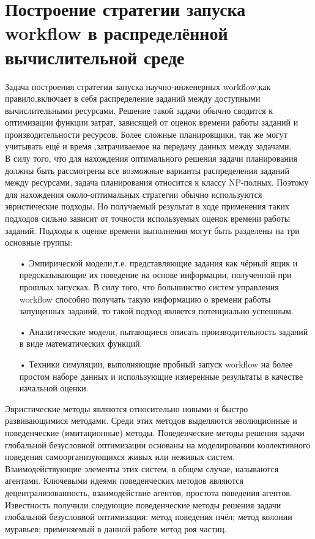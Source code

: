 \documentclass[a4paper,12pt]{article}
\begin{document}
\section{Построение стратегии запуска workflow в распределённой вычислительной среде}
Задача построения стратегии запуска научно-инженерных workflow,как правило,включает в себя распределение заданий между доступными вычислительными ресурсами. Решение такой задачи обычно сводится к оптимизации функции затрат, зависящей от оценок времени работы заданий и производительности ресурсов. Более сложные планировщики, так же могут учитывать ещё и время ,затрачиваемое на передачу данных между задачами. \\
В силу того, что для нахождения оптимального решения задачи планирования должны быть рассмотрены все возможные варианты распределения заданий между ресурсами, задача планирования относится к классу NP-полных. Поэтому для нахождения около-оптимальных стратегии обычно используются эвристические подходы. Но получаемый результат в ходе применения таких подходов сильно зависит от точности используемых оценок времени работы заданий. Подходы к оценке времени выполнения могут быть разделены на три основные группы:
\begin{enumerate}
\item[•] Эмпирической модели,т.е. представляющие задания как чёрный ящик и предсказывающие их поведение на основе информации, полученной при прошлых запусках. В силу того, что большинство систем управления workflow способно получать такую информацию о времени работы запущенных заданий, то такой подход является потенциально успешным.
\item[•] Аналитические модели, пытающиеся описать производительность заданий в виде математических функций.
\item[•] Техники симуляции, выполняющие пробный запуск workflow на более простом наборе данных и использующие измеренные результаты в качестве начальной оценки.
\end{enumerate}
Эвристические методы являются относительно новыми и быстро развивающимися методами. Среди этих методов выделяются эволюционные и поведенческие (имитационные) методы.
  Поведенческие методы решения задачи глобальной безусловной оптимизации основаны на моделировании коллективного поведения самоорганизующихся живых или неживых систем. Взаимодействующие элементы этих систем, в общем случае, называются агентами. Ключевыми идеями поведенческих методов являются децентрализованность, взаимодействие агентов, простота поведения агентов.
  Известность получили следующие поведенческие методы решения задачи глобальной безусловной оптимизации: метод поведения пчёл; метод колонии муравьев; применяемый в данной работе метод роя частиц.
  
\end{document}
